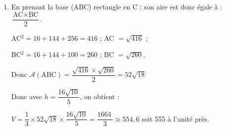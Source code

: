 \documentclass[10pt]{article}
\providecommand{\np}[2][]{{#2~#1}}
\begin{document}
\begin{enumerate}
\begin{enumerate}
		I appartient au plan (ABC) et appartient à $\Delta$, ses coordonnées $(x~;~y~;~z)$ vérifient donc l'équation du plan (ABC) et les équations paramétriques de $\Delta$ soit le système :
		
$\left\{\begin{array}{l c l}
x &=&12 + 3t\\
y &=&t\\
z &=&0t\\
3x + y - 4&=&0
\end{array}\right.$

En remplaçant dans la dernière équation $x$ et $y$ par leurs valeurs en fonction de $t$ on obtient $3(12 + 3t) + t - 4 = 0 \iff 36 + 9t + t - 4 = 0 \iff 10t + 32 = 0$

$\iff 10t = - 32 \iff t = - \dfrac{32}{10} = - \dfrac{16}{5}$.

En reportant cette valeur dans les deux premières équations de $\Delta$, on obtient :

$x = 12 -3 \times \dfrac{16}{5} = \dfrac{60}{5} - \dfrac{48}{5} = \dfrac{12}{5}$ ;
$y = - \dfrac{16}{5}$ et $z = 0$.

I$\left(\dfrac{12}{5}~;~- \dfrac{16}{5}~;0\right)$.

On calcule DI$^2 = \left(\dfrac{12}{5} - 12 \right)^2 + \left(- \dfrac{16}{5} - 0 \right)^2 + 0^2 = \left(-\dfrac{48}{5}\right)^2 + \left(- \dfrac{16}{5}\right)^2 = \dfrac{\np{2304}}{25} + \dfrac{256}{25} = \dfrac{\np{2560}}{25} = \dfrac{256 \times 10}{25}$.

Finalement DI $= \sqrt{\dfrac{256 \times 10}{25}} = \dfrac{16 \sqrt{10}}{5}$.
	\end{enumerate}
\item 





En prenant la base (ABC) rectangle en C : son aire est donc égale à :
$\dfrac{\text{AC} \times \text{BC}}{2}$.

AC$^2 = 16 + 144  + 256 = 416$ ; AC $ = \sqrt{416}$ ;

BC$^2 = 16 + 144 + 100 = 260$ ; BC $ = \sqrt{260}$.

Donc $\mathcal{A}(\text{ABC}) = \dfrac{\sqrt{416} \times \sqrt{260}}{2} = 52\sqrt{18}$

Donc avec $h = \dfrac{16 \sqrt{10}}{5}$, on obtient :

$V = \dfrac13 \times 52\sqrt{18} \times \dfrac{16 \sqrt{10}}{5} = \dfrac{\np{1664}}{3} \approx 554,6$ soit 555 à l'unité près.
\end{enumerate}

\bigskip
\end{document}
